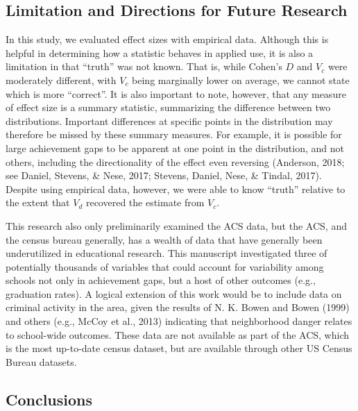 \documentclass[man, fleqn, noextraspace]{apa6}
\theoremstyle{definition}
\theoremstyle{definition}
\theoremstyle{definition}
\theoremstyle{remark}
\begin{document}
\hypertarget{limitation-and-directions-for-future-research}{%
\subsection{Limitation and Directions for Future
Research}\label{limitation-and-directions-for-future-research}}

In this study, we evaluated effect sizes with empirical data. Although
this is helpful in determining how a statistic behaves in applied use,
it is also a limitation in that \enquote{truth} was not known. That is,
while Cohen's \(D\) and \(V_c\) were moderately different, with \(V_c\)
being marginally lower on average, we cannot state which is more
\enquote{correct}. It is also important to note, however, that any
measure of effect size is a summary statistic, summarizing the
difference between two distributions. Important differences at specific
points in the distribution may therefore be missed by these summary
measures. For example, it is possible for large achievement gaps to be
apparent at one point in the distribution, and not others, including the
directionality of the effect even reversing (Anderson, 2018; see Daniel,
Stevens, \& Nese, 2017; Stevens, Daniel, Nese, \& Tindal, 2017). Despite
using empirical data, however, we were able to know \enquote{truth}
relative to the extent that \(V_d\) recovered the estimate from \(V_c\).

This research also only preliminarily examined the ACS data, but the
ACS, and the census bureau generally, has a wealth of data that have
generally been underutilized in educational research. This manuscript
investigated three of potentially thousands of variables that could
account for variability among schools not only in achievement gaps, but
a host of other outcomes (e.g., graduation rates). A logical extension
of this work would be to include data on criminal activity in the area,
given the results of N. K. Bowen and Bowen (1999) and others (e.g.,
McCoy et al., 2013) indicating that neighborhood danger relates to
school-wide outcomes. These data are not available as part of the ACS,
which is the most up-to-date census dataset, but are available through
other US Census Bureau datasets.

\hypertarget{conclusions}{%
\subsection{Conclusions}\label{conclusions}}
\end{document}
